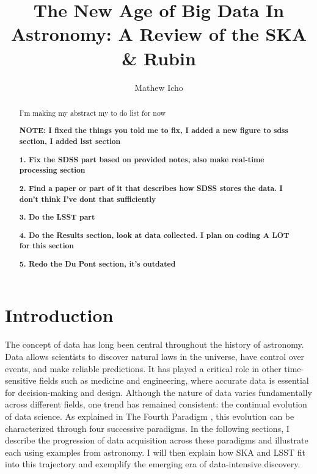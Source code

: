 \documentclass[preprint,linenumbers, longauthor]{aastex631}
\begin{document}
\title{The New Age of Big Data In Astronomy: A Review of the SKA \& Rubin}
\author{Mathew Icho}

\begin{abstract}
I'm making my abstract my to do list for now

\textbf{NOTE: I fixed the things you told me to fix, I added a new figure to sdss section, I added lsst section}

\textbf{1. Fix the SDSS part based on provided notes, also make real-time processing section}

\textbf{2. Find a paper or part of it that describes how SDSS stores the data. I don't think I've dont that sufficiently}

\textbf{3. Do the LSST part}

\textbf{4. Do the Results section, look at data collected. I plan on coding A LOT for this section}

\textbf{5. Redo the Du Pont section, it's outdated}

\end{abstract}

\tableofcontents

\section{Introduction}
The concept of data has long been central throughout the history of astronomy. Data allows scientists to discover natural laws in the universe, have control over events, and make reliable predictions. It has played a critical role in other time-sensitive fields such as medicine and engineering, where accurate data is essential for decision-making and design. 
Although the nature of data varies fundamentally across different fields, one trend has remained consistent: the continual evolution of data science. As explained in The Fourth Paradigm \citep{heyFourthParadigmDataIntensive2009}, this evolution can be characterized through four successive paradigms. 
In the following sections, I describe the progression of data acquisition across these paradigms and illustrate each using examples from astronomy. I will then explain how SKA and LSST fit into this trajectory and exemplify the emerging era of data-intensive discovery.
\end{document}
